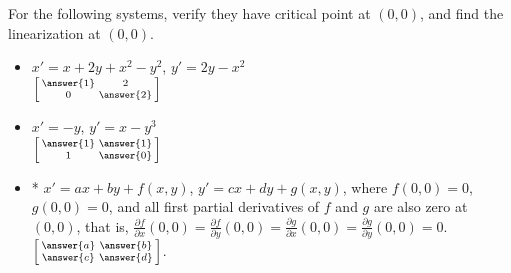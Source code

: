 \documentclass{ximera}
\begin{document}
\begin{exercise}
    For the following systems, verify they have critical point at $(0,0)$, and find the linearization at $(0,0)$.
    \begin{itemize}
        \item $x'=x+2y+x^2-y^2$, \enspace $y'=2y-x^2$\\
            $\left[\begin{smallmatrix} \answer{1} & 2 \\ 0 & \answer{2} \end{smallmatrix}\right]$
        \item $x'=-y$, \enspace $y'=x-y^3$\\
            $\left[\begin{smallmatrix} \answer{1} & \answer{1} \\ 1 & \answer{0} \end{smallmatrix}\right]$
        \item* $x'=ax+by+f(x,y)$, $y'=cx+dy+g(x,y)$, 
            where $f(0,0) = 0$, $g(0,0) = 0$, and all first partial derivatives of $f$ and $g$ are also zero at $(0,0)$, that is, $\frac{\partial f}{\partial x}(0,0) = \frac{\partial f}{\partial y}(0,0) = \frac{\partial g}{\partial x}(0,0) = \frac{\partial g}{\partial y}(0,0) = 0$.\\
            $\left[\begin{smallmatrix} \answer{a} & \answer{b} \\ \answer{c} & \answer{d} \end{smallmatrix}\right]$.
    \end{itemize}
\end{exercise}
\end{document}
